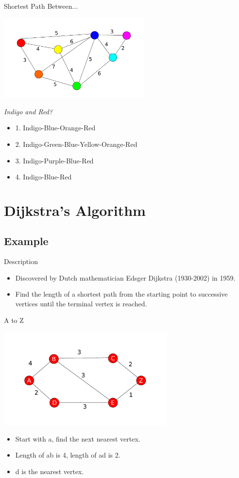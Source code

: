 \documentclass{beamer}
\begin{document}
\begin{frame}{Shortest Path Between...}
	\centerline{\includegraphics[width=3.0in]{weighted.pdf}}
	\textit{Indigo and Red?}
        \begin{itemize}
	\item
		1. Indigo-Blue-Orange-Red
	\item
		2. Indigo-Green-Blue-Yellow-Orange-Red
	\item
		3. Indigo-Purple-Blue-Red
	\item
		\alert{4. Indigo-Blue-Red}
	\end{itemize}
\end{frame}

\section{Dijkstra's Algorithm}
\subsection{Example}

\begin{frame}{Description}
\begin{itemize}
\item
	Discovered by Dutch mathematician Edsger Dijkstra (1930-2002) in 1959.
\item
	Find the length of a shortest path from the starting point to successive vertices until the terminal vertex is reached.
\end{itemize}
\end{frame}

\begin{frame}{A to Z}
	\centerline{\includegraphics[width=3.5in]{weighted_ex_2.pdf}}
	\begin{itemize}
	\item
		Start with a, find the next nearest vertex.
	\item
		Length of ab is 4, length of ad is 2.
	\item
		d is the nearest vertex.
	\end{itemize}
\end{frame}
\end{document}
